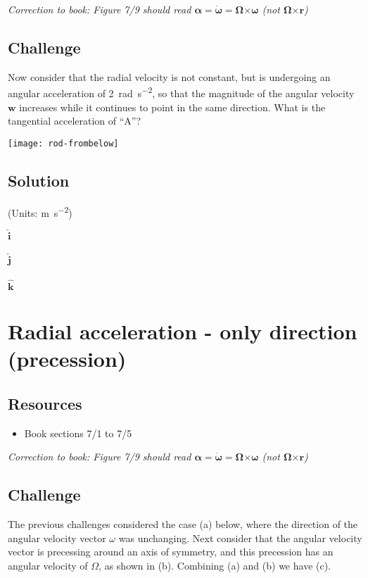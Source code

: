 \emph{Correction to book: Figure 7/9 should read $\bm{\alpha} = \bm{\dot{\omega}} = \bm{\Omega} \bm{\times} \bm{\omega}$ (not $\bm{\Omega} \bm{\times} \bm{r}$)}

\subsection*{Challenge}
Now consider that the radial velocity is not constant, but is undergoing an angular acceleration of \SI{2}{\radian\per\square\second}, so that the magnitude of the angular velocity $\bm{w}$ increases while it continues to point in the same direction. What is the tangential acceleration of ``A''?

\texttt{[image: rod-frombelow]}

\subsection*{Solution}
(Units: \si{\meter\per\square\second})

$\bm{\hat{i}}$\\
\\

$\bm{\hat{j}}$\\
\\

$\bm{\hat{k}}$\\




\newpage
\section{Radial acceleration - only direction (precession)}

\subsection*{Resources}
\begin{itemize}
    \item Book sections 7/1 to 7/5
\end{itemize}

\emph{Correction to book: Figure 7/9 should read $\bm{\alpha} = \bm{\dot{\omega}} = \bm{\Omega} \bm{\times} \bm{\omega}$ (not $\bm{\Omega} \bm{\times} \bm{r}$)}

\subsection*{Challenge}
The previous challenges considered the case (a) below, where the direction of the angular velocity vector $\omega$ was unchanging. Next consider that the angular velocity vector is precessing around an axis of symmetry, and this precession has an angular velocity of $\Omega$, as shown in (b). Combining (a) and (b) we have (c).

